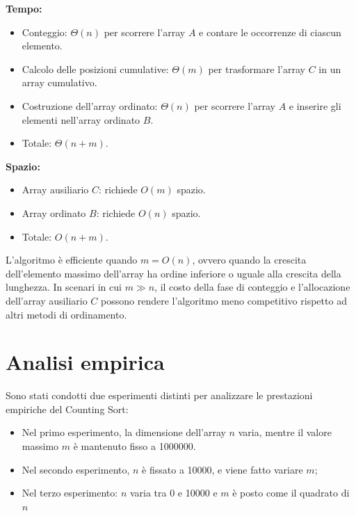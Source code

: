 \documentclass[a4paper, 12pt, oneside]{book}
\begin{document}
\noindent \textbf{Tempo:}

\begin{itemize}
    \item Conteggio: \(\Theta(n)\) per scorrere l'array \(A\) e contare le occorrenze di ciascun elemento.
    \item Calcolo delle posizioni cumulative: \(\Theta(m)\) per trasformare l'array \(C\) in un array cumulativo.
    \item Costruzione dell'array ordinato: \(\Theta(n)\) per scorrere l'array \(A\) e inserire gli elementi nell'array ordinato \(B\).
    \item Totale: \(\Theta(n + m)\).
\end{itemize}

\noindent \textbf{Spazio:}

\begin{itemize}
    \item Array ausiliario \(C\): richiede \(O(m)\) spazio.
    \item Array ordinato \(B\): richiede \(O(n)\) spazio.
    \item Totale: \(O(n + m)\).
\end{itemize}

\noindent L'algoritmo è efficiente quando \(m = O(n)\), ovvero quando la crescita dell'elemento massimo dell'array ha ordine inferiore o uguale alla crescita della lunghezza.
In scenari in cui \(m \gg n\), il costo della fase di conteggio e l'allocazione dell'array ausiliario \(C\) possono rendere l'algoritmo meno competitivo rispetto ad altri metodi di ordinamento.


\section{Analisi empirica}

Sono stati condotti due esperimenti distinti per analizzare le prestazioni empiriche del Counting Sort:

\begin{itemize}
    \item Nel primo esperimento, la dimensione dell'array \(n\) varia, mentre il valore massimo \(m\) è mantenuto fisso a 1000000.
    \item Nel secondo esperimento, \(n\) è fissato a 10000, e viene fatto variare \(m\);
    \item Nel terzo esperimento: \(n\) varia tra 0 e 10000 e \(m\) è posto come il quadrato di \(n\)
\end{itemize}
\end{document}
